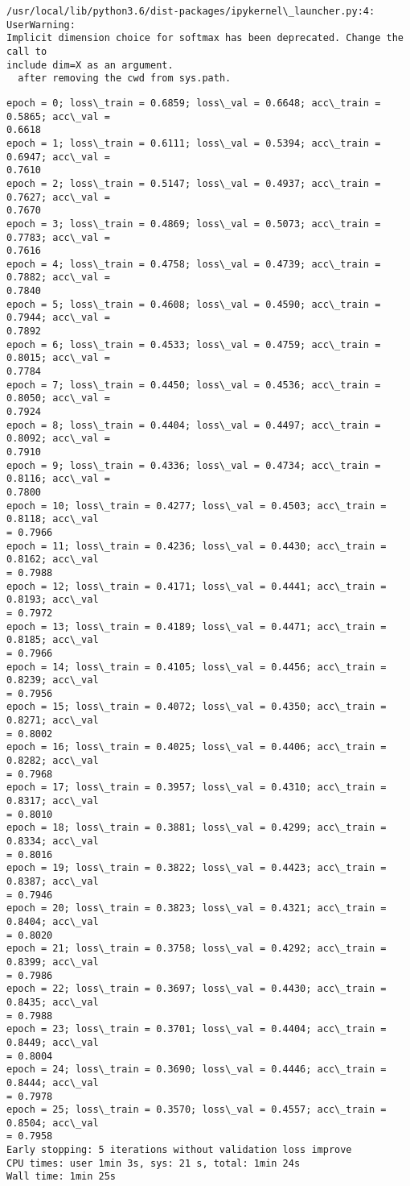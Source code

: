 \documentclass[10pt]{article}
\begin{document}
    \begin{Verbatim}[commandchars=\\\{\}]
/usr/local/lib/python3.6/dist-packages/ipykernel\_launcher.py:4: UserWarning:
Implicit dimension choice for softmax has been deprecated. Change the call to
include dim=X as an argument.
  after removing the cwd from sys.path.
    \end{Verbatim}

    \begin{Verbatim}[commandchars=\\\{\}]
epoch = 0; loss\_train = 0.6859; loss\_val = 0.6648; acc\_train = 0.5865; acc\_val =
0.6618
epoch = 1; loss\_train = 0.6111; loss\_val = 0.5394; acc\_train = 0.6947; acc\_val =
0.7610
epoch = 2; loss\_train = 0.5147; loss\_val = 0.4937; acc\_train = 0.7627; acc\_val =
0.7670
epoch = 3; loss\_train = 0.4869; loss\_val = 0.5073; acc\_train = 0.7783; acc\_val =
0.7616
epoch = 4; loss\_train = 0.4758; loss\_val = 0.4739; acc\_train = 0.7882; acc\_val =
0.7840
epoch = 5; loss\_train = 0.4608; loss\_val = 0.4590; acc\_train = 0.7944; acc\_val =
0.7892
epoch = 6; loss\_train = 0.4533; loss\_val = 0.4759; acc\_train = 0.8015; acc\_val =
0.7784
epoch = 7; loss\_train = 0.4450; loss\_val = 0.4536; acc\_train = 0.8050; acc\_val =
0.7924
epoch = 8; loss\_train = 0.4404; loss\_val = 0.4497; acc\_train = 0.8092; acc\_val =
0.7910
epoch = 9; loss\_train = 0.4336; loss\_val = 0.4734; acc\_train = 0.8116; acc\_val =
0.7800
epoch = 10; loss\_train = 0.4277; loss\_val = 0.4503; acc\_train = 0.8118; acc\_val
= 0.7966
epoch = 11; loss\_train = 0.4236; loss\_val = 0.4430; acc\_train = 0.8162; acc\_val
= 0.7988
epoch = 12; loss\_train = 0.4171; loss\_val = 0.4441; acc\_train = 0.8193; acc\_val
= 0.7972
epoch = 13; loss\_train = 0.4189; loss\_val = 0.4471; acc\_train = 0.8185; acc\_val
= 0.7966
epoch = 14; loss\_train = 0.4105; loss\_val = 0.4456; acc\_train = 0.8239; acc\_val
= 0.7956
epoch = 15; loss\_train = 0.4072; loss\_val = 0.4350; acc\_train = 0.8271; acc\_val
= 0.8002
epoch = 16; loss\_train = 0.4025; loss\_val = 0.4406; acc\_train = 0.8282; acc\_val
= 0.7968
epoch = 17; loss\_train = 0.3957; loss\_val = 0.4310; acc\_train = 0.8317; acc\_val
= 0.8010
epoch = 18; loss\_train = 0.3881; loss\_val = 0.4299; acc\_train = 0.8334; acc\_val
= 0.8016
epoch = 19; loss\_train = 0.3822; loss\_val = 0.4423; acc\_train = 0.8387; acc\_val
= 0.7946
epoch = 20; loss\_train = 0.3823; loss\_val = 0.4321; acc\_train = 0.8404; acc\_val
= 0.8020
epoch = 21; loss\_train = 0.3758; loss\_val = 0.4292; acc\_train = 0.8399; acc\_val
= 0.7986
epoch = 22; loss\_train = 0.3697; loss\_val = 0.4430; acc\_train = 0.8435; acc\_val
= 0.7988
epoch = 23; loss\_train = 0.3701; loss\_val = 0.4404; acc\_train = 0.8449; acc\_val
= 0.8004
epoch = 24; loss\_train = 0.3690; loss\_val = 0.4446; acc\_train = 0.8444; acc\_val
= 0.7978
epoch = 25; loss\_train = 0.3570; loss\_val = 0.4557; acc\_train = 0.8504; acc\_val
= 0.7958
Early stopping: 5 iterations without validation loss improve
CPU times: user 1min 3s, sys: 21 s, total: 1min 24s
Wall time: 1min 25s
    \end{Verbatim}
\end{document}
